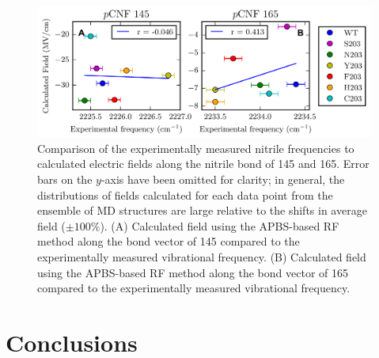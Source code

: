 \begin{figure}
    \center
    \includegraphics[width=6.0in]{figures-gfp-pKa/calc_forces.png}
    \caption{Comparison of the experimentally measured nitrile frequencies to calculated electric fields along the nitrile bond of \pCNF{} 145 and 165. Error bars on the $y$-axis have been omitted for clarity; in general, the distributions of fields calculated for each data point from the ensemble of MD structures are large relative to the shifts in average field ($\pm100\%$). (A) Calculated field using the APBS-based RF method along the bond vector of \pCNF{} 145 compared to the experimentally measured vibrational frequency. (B) Calculated field using the APBS-based RF method along the bond vector of \pCNF{} 165 compared to the experimentally measured vibrational frequency.}
    \label{fig:calc_forces}
\end{figure}

\section{Conclusions}\label{pKa-conclusion}


